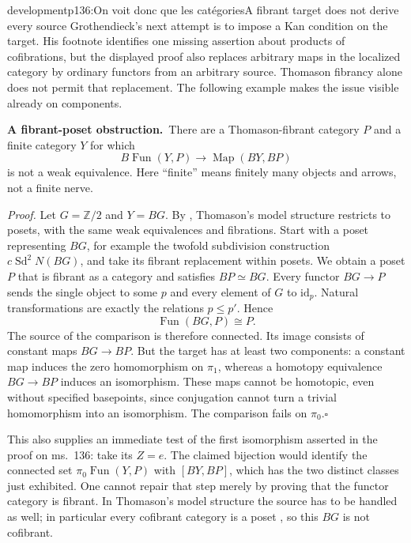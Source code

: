 \begin{dcomment}{development}{p136:On voit donc que les catégories}{A fibrant target does not derive every source}
Grothendieck's next attempt is to impose a Kan condition on the target. His footnote identifies one missing assertion about products of cofibrations, but the displayed proof also replaces arbitrary maps in the localized category by ordinary functors from an arbitrary source. Thomason fibrancy alone does not permit that replacement. The following example makes the issue visible already on components.

\textbf{A fibrant-poset obstruction.}\ours\ There are a Thomason-fibrant category $P$ and a finite category $Y$ for which
\[
 B\operatorname{Fun}(Y,P)\longrightarrow
                 \operatorname{Map}(BY,BP)
\]
is not a weak equivalence. Here ``finite'' means finitely many objects and arrows, not a finite nerve.

\emph{Proof.} Let $G=\mathbb Z/2$ and $Y=BG$. By \citet[Theorem~2.6]{Raptis2010}, Thomason's model structure restricts to posets, with the same weak equivalences and fibrations. Start with a poset representing $BG$, for example the twofold subdivision construction $c\operatorname{Sd}^2N(BG)$, and take its fibrant replacement within posets. We obtain a poset $P$ that is fibrant as a category and satisfies $BP\simeq BG$. Every functor $BG\to P$ sends the single object to some $p$ and every element of $G$ to $\mathrm{id}_p$. Natural transformations are exactly the relations $p\leq p'$. Hence
\[
                        \operatorname{Fun}(BG,P)\cong P.
\]
The source of the comparison is therefore connected. Its image consists of constant maps $BG\to BP$. But the target has at least two components: a constant map induces the zero homomorphism on $\pi_1$, whereas a homotopy equivalence $BG\to BP$ induces an isomorphism. These maps cannot be homotopic, even without specified basepoints, since conjugation cannot turn a trivial homomorphism into an isomorphism. The comparison fails on $\pi_0$.\hfill$\square$

This also supplies an immediate test of the first isomorphism asserted in the proof on ms.~136: take its $Z=e$. The claimed bijection would identify the connected set $\pi_0\operatorname{Fun}(Y,P)$ with $[BY,BP]$, which has the two distinct classes just exhibited. One cannot repair that step merely by proving that the functor category is fibrant. In Thomason's model structure the source has to be handled as well; in particular every cofibrant category is a poset \citep[Proposition~5.7]{Thomason1980}, so this $BG$ is not cofibrant.


\end{dcomment}
